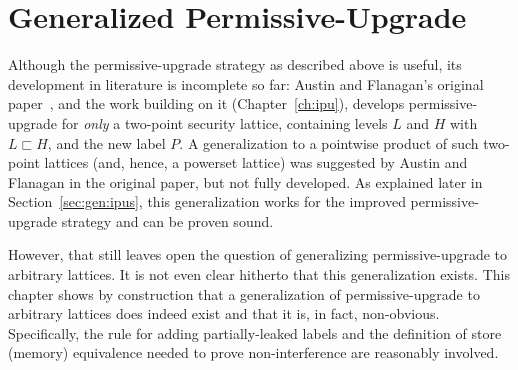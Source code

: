 \chapter{Generalized Permissive-Upgrade}
 
Although the permissive-upgrade strategy as described above is useful,
its development in literature is incomplete so far: Austin and
Flanagan's original paper~\cite{plas10}, and the work building on it
(Chapter~\ref{ch:ipu}), develops permissive-upgrade for
\emph{only} a two-point security lattice, containing levels $L$ and
$H$ with $L \sqsubset H$, and the new label 
$P$. A generalization to a pointwise product of such two-point
lattices (and, hence, a powerset lattice) was suggested by Austin and
Flanagan in the original paper, but not fully developed. As explained
later in Section~\ref{sec:gen:ipus}, this generalization works for the
improved permissive-upgrade strategy and can be proven sound. 

However, that still leaves open the question of generalizing
permissive-upgrade to arbitrary lattices. It is not even clear
hitherto that this generalization exists. This chapter shows by
construction that a generalization of permissive-upgrade to arbitrary
lattices does indeed exist and that it is, in fact,
non-obvious. Specifically, the rule for adding partially-leaked labels
and the definition of store (memory) equivalence needed to prove
non-interference are reasonably involved. 


% 



